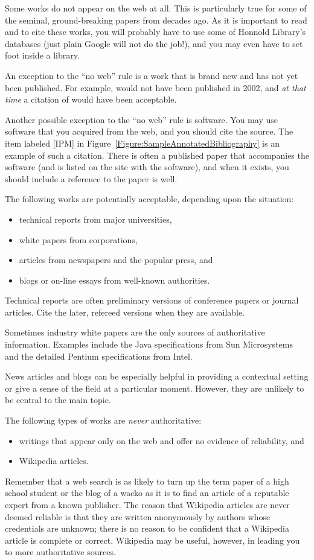 \documentclass[finalcopy]{srpaper}
\def\hyperref[#1]{}
\let\plainref\ref
\newcommand{\plainref}{\ref*}
\newcommand{\namedref}[2]{\hyperref[#2]{#1~\plainref{#2}}}
\begin{document}
Some works do not appear on the web at all. This is
particularly true for some of the seminal, ground-breaking
papers from decades ago. As it is important to read and to
cite these works, you will probably have to use some of
Honnold Library's databases (just plain Google will not do
the job!), and you may even have to set foot inside a
library.

An exception to the ``no web'' rule is a work that is brand
new and has not yet been published. For example,
\cite{AKS2004} would not have been published in 2002, and
\emph{at that time} a citation of \cite{AKS2002} would have
been acceptable.

Another possible exception to the ``no web'' rule is
software. You may use software that you acquired from the
web, and you should cite the source. The item labeled [IPM]
in \namedref{Figure}{Figure:SampleAnnotatedBibliography} is
an example of such a citation. There is often a published
paper that accompanies the software (and is listed on the
site with the software), and when it exists, you should
include a reference to the paper is well.

The following works are potentially acceptable, depending
upon the situation:
\begin{itemize}
\item technical reports from major universities,
\item white papers from corporations,
\item articles from newspapers and the popular press, and
\item blogs or on-line essays from well-known authorities.
\end{itemize}
Technical reports are often preliminary versions of conference
papers or journal articles. Cite the later, refereed versions
when they are available.

Sometimes industry white papers are the only sources of 
authoritative information. Examples include the Java 
specifications from Sun Microsystems and the detailed
Pentium specifications from Intel.

News articles and blogs can be especially helpful in
providing a contextual setting or give a sense of the field
at a particular moment. However, they are unlikely
to be central to the main topic.

The following types of works are \emph{never} authoritative:
\begin{itemize}
\item writings that appear only on the web and offer no
evidence of reliability, and 
\item Wikipedia articles.
\end{itemize}
Remember that a web search is as likely to turn up the term
paper of a high school student or the blog of a wacko as it
is to find an article of a reputable expert from a known
publisher. The reason that Wikipedia articles are never
deemed reliable is that they are written anonymously by
authors whose credentials are unknown; there is no reason to
be confident that a Wikipedia article is complete or
correct. Wikipedia may be useful, however, in leading you to
more authoritative sources.
\end{document}
